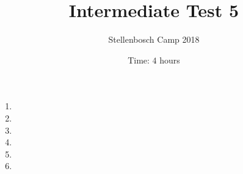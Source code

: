 \documentclass{article}
\title{Intermediate Test 5}
\author{Stellenbosch Camp 2018}
\date{Time: $4$ hours}
\begin{document}
\maketitle

\begin{enumerate}[1.]

\item %


\vspace{6pt}
\item %


\vspace{6pt}
\item %


\vspace{6pt}
\item %


\vspace{6pt}
\item %


\vspace{6pt}
\item %


\end{enumerate}


\vfill
\centering
\begin{BVerbatim}
\end{BVerbatim}
\end{document}
